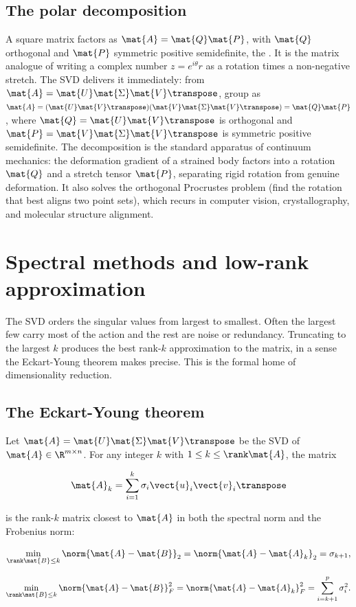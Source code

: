 \subsection{The polar decomposition}

A square matrix factors as $\mat{A} = \mat{Q} \mat{P}$, with
$\mat{Q}$ orthogonal and $\mat{P}$ symmetric positive semidefinite,
the . It is the matrix analogue of
writing a complex number $z = e^{i\theta} r$ as a rotation times a
non-negative stretch. The SVD delivers it immediately: from
$\mat{A} = \mat{U} \mat{\Sigma} \mat{V}\transpose$, group as
$\mat{A} = (\mat{U} \mat{V}\transpose)(\mat{V} \mat{\Sigma}
\mat{V}\transpose) = \mat{Q} \mat{P}$, where $\mat{Q} = \mat{U}
\mat{V}\transpose$ is orthogonal and $\mat{P} = \mat{V} \mat{\Sigma}
\mat{V}\transpose$ is symmetric positive semidefinite. The
decomposition is the standard apparatus of continuum mechanics: the
deformation gradient of a strained body factors into a rotation
$\mat{Q}$ and a stretch tensor $\mat{P}$, separating rigid rotation
from genuine deformation. It also solves the orthogonal Procrustes
problem (find the rotation that best aligns two point sets), which
recurs in computer vision, crystallography, and molecular
structure alignment.

\section{Spectral methods and low-rank approximation}

The SVD orders the singular values from largest to smallest. Often
the largest few carry most of the action and the rest are noise or
redundancy. Truncating to the largest $k$ produces the best rank-$k$
approximation to the matrix, in a sense the Eckart-Young theorem
makes precise. This is the formal home of dimensionality reduction.

\subsection{The Eckart-Young theorem}

\begin{theorem}
Let $\mat{A} = \mat{U} \mat{\Sigma} \mat{V}\transpose$ be the SVD of
$\mat{A} \in \R^{m \times n}$. For any integer $k$ with $1 \leq k \leq
\rank \mat{A}$, the matrix

\[
\mat{A}_{k} = \sum_{i=1}^{k} \sigma_{i} \vect{u}_{i} \vect{v}_{i}\transpose
\]

is the rank-$k$ matrix closest to $\mat{A}$ in both the spectral
norm and the Frobenius norm:

\[
\min_{\rank \mat{B} \leq k} \norm{\mat{A} - \mat{B}}_{2} =
\norm{\mat{A} - \mat{A}_{k}}_{2} = \sigma_{k+1},
\]

\[
\min_{\rank \mat{B} \leq k} \norm{\mat{A} - \mat{B}}_{F}^{2} =
\norm{\mat{A} - \mat{A}_{k}}_{F}^{2} = \sum_{i=k+1}^{p} \sigma_{i}^{2}.
\]
\end{theorem}

